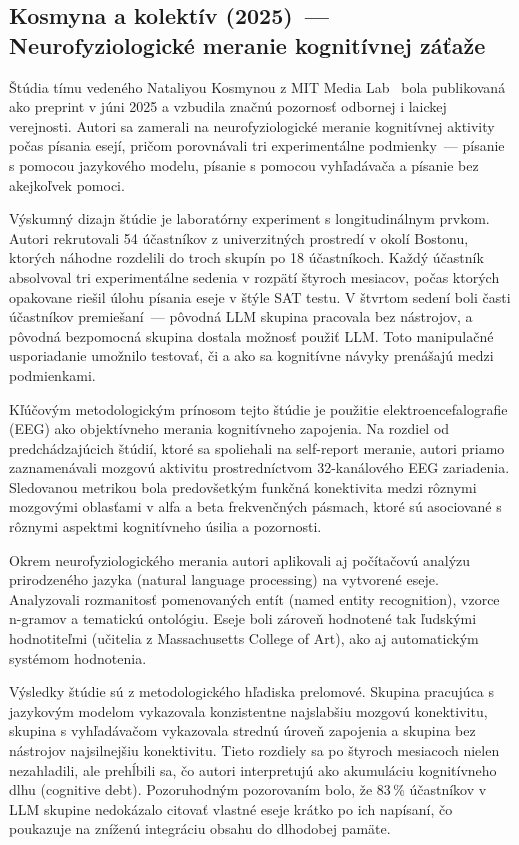 \subsection{Kosmyna a kolektív (2025)~--- Neurofyziologické meranie kognitívnej záťaže}

Štúdia tímu vedeného Nataliyou Kosmynou z MIT Media Lab~\cite{kosmyna2025brain} bola publikovaná ako preprint v júni 2025 a vzbudila značnú pozornosť odbornej i laickej verejnosti. Autori sa zamerali na neurofyziologické meranie kognitívnej aktivity počas písania esejí, pričom porovnávali tri experimentálne podmienky~--- písanie s pomocou jazykového modelu, písanie s pomocou vyhľadávača a písanie bez akejkoľvek pomoci.

Výskumný dizajn štúdie je laboratórny experiment s longitudinálnym prvkom. Autori rekrutovali 54 účastníkov z univerzitných prostredí v okolí Bostonu, ktorých náhodne rozdelili do troch skupín po 18 účastníkoch. Každý účastník absolvoval tri experimentálne sedenia v rozpätí štyroch mesiacov, počas ktorých opakovane riešil úlohu písania eseje v štýle SAT testu. V štvrtom sedení boli časti účastníkov premiešaní~--- pôvodná LLM skupina pracovala bez nástrojov, a pôvodná bezpomocná skupina dostala možnosť použiť LLM. Toto manipulačné usporiadanie umožnilo testovať, či a ako sa kognitívne návyky prenášajú medzi podmienkami.

Kľúčovým metodologickým prínosom tejto štúdie je použitie elektroencefalografie (EEG) ako objektívneho merania kognitívneho zapojenia. Na rozdiel od predchádzajúcich štúdií, ktoré sa spoliehali na self-report meranie, autori priamo zaznamenávali mozgovú aktivitu prostredníctvom 32-kanálového EEG zariadenia. Sledovanou metrikou bola predovšetkým funkčná konektivita medzi rôznymi mozgovými oblasťami v alfa a beta frekvenčných pásmach, ktoré sú asociované s rôznymi aspektmi kognitívneho úsilia a pozornosti.

Okrem neurofyziologického merania autori aplikovali aj počítačovú analýzu prirodzeného jazyka (natural language processing) na vytvorené eseje. Analyzovali rozmanitosť pomenovaných entít (named entity recognition), vzorce n-gramov a tematickú ontológiu. Eseje boli zároveň hodnotené tak ľudskými hodnotiteľmi (učitelia z Massachusetts College of Art), ako aj automatickým systémom hodnotenia.

Výsledky štúdie sú z metodologického hľadiska prelomové. Skupina pracujúca s jazykovým modelom vykazovala konzistentne najslabšiu mozgovú konektivitu, skupina s vyhľadávačom vykazovala strednú úroveň zapojenia a skupina bez nástrojov najsilnejšiu konektivitu. Tieto rozdiely sa po štyroch mesiacoch nielen nezahladili, ale prehĺbili sa, čo autori interpretujú ako akumuláciu kognitívneho dlhu (cognitive debt). Pozoruhodným pozorovaním bolo, že 83\,\% účastníkov v LLM skupine nedokázalo citovať vlastné eseje krátko po ich napísaní, čo poukazuje na zníženú integráciu obsahu do dlhodobej pamäte.

